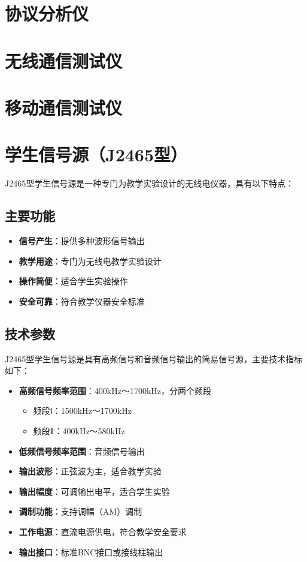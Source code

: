 \documentclass[12pt,UTF8]{ctexbook}
\begin{document}
\section{协议分析仪}
\section{无线通信测试仪}
\section{移动通信测试仪}

\section{学生信号源（J2465型）}

J2465型学生信号源是一种专门为教学实验设计的无线电仪器，具有以下特点：

\subsection{主要功能}
\begin{itemize}[leftmargin=2cm]
	\item \textbf{信号产生}：提供多种波形信号输出
	\item \textbf{教学用途}：专门为无线电教学实验设计
	\item \textbf{操作简便}：适合学生实验操作
	\item \textbf{安全可靠}：符合教学仪器安全标准
\end{itemize}

\subsection{技术参数}
J2465型学生信号源是具有高频信号和音频信号输出的简易信号源，主要技术指标如下：

\begin{itemize}[leftmargin=2cm]
	\item \textbf{高频信号频率范围}：400kHz～1700kHz，分两个频段
	\begin{itemize}[leftmargin=1cm]
		\item 频段Ⅰ：1500kHz～1700kHz
		\item 频段Ⅱ：400kHz～580kHz
	\end{itemize}
	\item \textbf{低频信号频率范围}：音频信号输出
	\item \textbf{输出波形}：正弦波为主，适合教学实验
	\item \textbf{输出幅度}：可调输出电平，适合学生实验
	\item \textbf{调制功能}：支持调幅（AM）调制
	\item \textbf{工作电源}：直流电源供电，符合教学安全要求
	\item \textbf{输出接口}：标准BNC接口或接线柱输出
\end{itemize}
\end{document}
